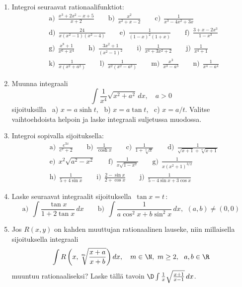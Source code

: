 \Harj
\begin{enumerate}

\item
Integroi seuraavat rationaalifunktiot:
\begin{align*}
&\text{a)}\ \ \frac{x^3+2x^2-x+5}{x+2} \qquad
 \text{b)}\ \ \frac{x^2}{x^2+x-2} \qquad
 \text{c)}\ \ \frac{1}{x^3-4x^2+3x} \\
&\text{d)}\ \ \frac{24}{x(x^2-1)(x^2-4)} \qquad
 \text{e)}\ \ \frac{1}{(1-x)^2(1+x)} \qquad
 \text{f)}\ \ \frac{3+x-2x^3}{1-x^3} \\
&\text{g)}\ \ \frac{x^8+1}{x^6+x^4} \qquad
 \text{h)}\ \ \frac{3x^2+1}{(x^2-1)^2} \qquad
 \text{i)}\ \ \frac{1}{x^4+3x^2+2} \qquad
 \text{j)}\ \ \frac{1}{x^4+1} \\
&\text{k)}\ \ \frac{1}{x(x^2+a^2)} \qquad
 \text{l)}\ \ \frac{1}{x^2(x^2-a^2)} \qquad
 \text{m)}\ \ \frac{x^3}{x^3-a^3} \qquad
 \text{n)}\ \ \frac{1}{x^4-a^4}
\end{align*}

\item
Muunna integraali 
\[
\int \frac{1}{x^4}{\sqrt{x^2+a^2}}\,dx, \quad a>0
\]
sijoituksilla \ a) $x=a\sinh t$, \ b) $x=a\tan t$, \ c) $x=a/t$. Valitse vaihtoehdoista
helpoin ja laske integraali suljetussa muodossa.

\item
Integroi sopivalla sijoituksella:
\begin{align*}
&\text{a)}\ \ \frac{e^{3x}}{e^x+2} \qquad
 \text{b)}\ \ \frac{1}{\cosh x} \qquad
 \text{c)}\ \ \frac{1}{1+\sqrt[3]{x}} \qquad
 \text{d)}\ \ \frac{1}{\sqrt{x+1}+\sqrt[4]{x+1}} \\
&\text{e)}\ \ x^2\sqrt{a^2-x^2} \qquad
 \text{f)}\ \ \frac{1}{x\sqrt{1-x^2}} \qquad
 \text{g)}\ \ \frac{1}{x(x^2+1)^{3/2}} \\
&\text{h)}\ \ \frac{1}{5+4\sin x} \qquad
 \text{i)}\ \ \frac{2-\sin x}{2+\cos x} \qquad
 \text{j)}\ \ \frac{1}{5-4\sin x+3\cos x}
\end{align*}

\item
Laske seuraavat integraalit sijoituksella $\,\tan x=t$\,:
\[
\text{a)}\ \ \int \frac{\tan x}{1+2\tan x}\,dx \qquad
\text{b)}\ \ \int \frac{1}{a\cos^2 x+b\sin^2 x}\,dx,\,\ (a,b) \neq (0,0)
\]

\item
Jos $R(x,y)$ on kahden muuttujan rationaalinen lauseke, niin millaisella sijoituksella
integraali
\[
\int R\left(x,\sqrt[m]{\frac{x+a}{x+b}}\right)dx, \quad m\in\N,\ m \ge 2,\ \ a,b\in\R
\]
muuntuu rationaaliseksi? Laske tällä tavoin $\D\int\frac{1}{x}\sqrt{\frac{x+1}{x-1}}\,dx$.



\end{enumerate}
